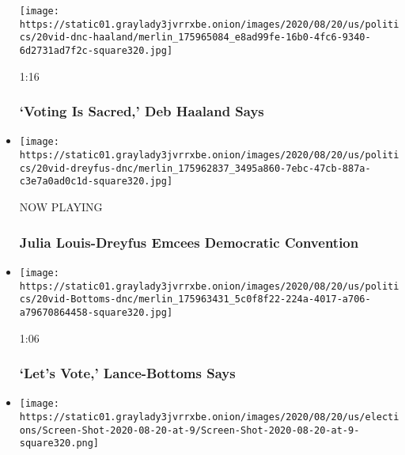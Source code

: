 \begin{itemize}
  \texttt{[image: https://static01.graylady3jvrrxbe.onion/images/2020/08/20/us/politics/20vid-dnc-haaland/merlin\_175965084\_e8ad99fe-16b0-4fc6-9340-6d2731ad7f2c-square320.jpg]}

  1:16

  \hypertarget{voting-is-sacred-deb-haaland-says}{%
  \subsubsection{`Voting Is Sacred,' Deb Haaland
  Says}\label{voting-is-sacred-deb-haaland-says}}
\item
  \texttt{[image: https://static01.graylady3jvrrxbe.onion/images/2020/08/20/us/politics/20vid-dreyfus-dnc/merlin\_175962837\_3495a860-7ebc-47cb-887a-c3e7a0ad0c1d-square320.jpg]}

  NOW PLAYING

  \hypertarget{julia-louis-dreyfus-emcees-democratic-convention-2}{%
  \subsubsection{Julia Louis-Dreyfus Emcees Democratic
  Convention}\label{julia-louis-dreyfus-emcees-democratic-convention-2}}
\item
  \href{https://www.nytimes3xbfgragh.onion/video/us/elections/100000007299826/keisha-lance-bottoms-speaks-dnc.html?action=click\&module=video-series-bar\&region=header\&pgtype=Article\&playlistId=video/2020-Elections}{}

  \texttt{[image: https://static01.graylady3jvrrxbe.onion/images/2020/08/20/us/politics/20vid-Bottoms-dnc/merlin\_175963431\_5c0f8f22-224a-4017-a706-a79670864458-square320.jpg]}

  1:06

  \hypertarget{lets-vote-lance-bottoms-says}{%
  \subsubsection{`Let's Vote,' Lance-Bottoms
  Says}\label{lets-vote-lance-bottoms-says}}
\item
  \href{https://www.nytimes3xbfgragh.onion/video/us/elections/100000007299993/gavin-newsom-speaks-dnc.html?action=click\&module=video-series-bar\&region=header\&pgtype=Article\&playlistId=video/2020-Elections}{}

  \texttt{[image: https://static01.graylady3jvrrxbe.onion/images/2020/08/20/us/elections/Screen-Shot-2020-08-20-at-9/Screen-Shot-2020-08-20-at-9-square320.png]}


\end{itemize}
